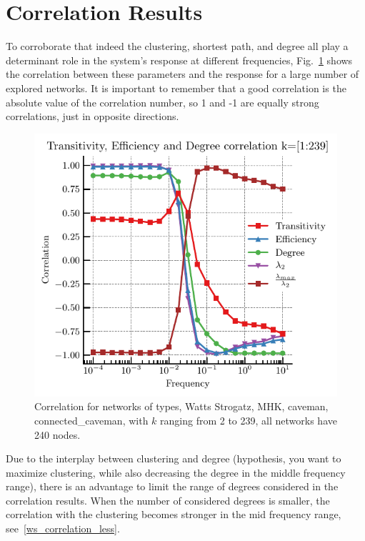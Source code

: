 \documentclass[fleqn,10pt]{wlscirep}
\begin{document}
\newpage
\section{Correlation Results}
To corroborate that indeed the clustering, shortest path, and degree all play a determinant role in the system's response at different frequencies, Fig.~\ref{ws_correlation} shows the correlation between these parameters and the response for a large number of explored networks. It is important to remember that a good correlation is the absolute value of the correlation number, so 1 and -1 are equally strong correlations, just in opposite directions.

\begin{figure}[H]
    \includegraphics[width=0.8\linewidth]{fig/Transitiviry_Efficiency_DEgre_correlation_ALL}
    \caption{Correlation for networks of types, Watts Strogatz, MHK, caveman, connected\_caveman, with $k$ ranging from 2 to 239, all networks have 240 nodes.}
    \label{ws_correlation}
\end{figure}

Due to the interplay between clustering and degree (hypothesis, you want to maximize clustering, while also decreasing the degree in the middle frequency range), there is an advantage to limit the range of degrees considered in the correlation results. When the number of considered degrees is smaller, the correlation with the clustering becomes stronger in the mid frequency range, see~\ref{ws_correlation_less}.
\end{document}
